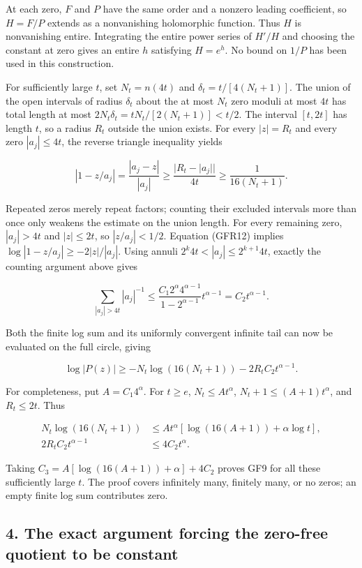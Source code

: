 At each zero, \(F\) and \(P\) have the same order and a nonzero leading coefficient, so \(H=F/P\) extends as a nonvanishing holomorphic function. Thus \(H\) is nonvanishing entire. Integrating the entire power series of \(H'/H\) and choosing the constant at zero gives an entire \(h\) satisfying \(H=e^h\). No bound on \(1/P\) has been used in this construction.

For sufficiently large \(t\), set \(N_t=n(4t)\) and \(\delta_t=t/[4(N_t+1)]\). The union of the open intervals of radius \(\delta_t\) about the at most \(N_t\) zero moduli at most \(4t\) has total length at most \(2N_t\delta_t=tN_t/[2(N_t+1)]<t/2\). The interval \([t,2t]\) has length \(t\), so a radius \(R_t\) outside the union exists. For every \(|z|=R_t\) and every zero \(|a_j|\le4t\), the reverse triangle inequality yields

\[
|1-z/a_j|=\frac{|a_j-z|}{|a_j|}
\ge\frac{|R_t-|a_j||}{4t}
\ge\frac1{16(N_t+1)}.
\tag{GFR13}
\]

Repeated zeros merely repeat factors; counting their excluded intervals more than once only weakens the estimate on the union length. For every remaining zero, \(|a_j|>4t\) and \(|z|\le2t\), so \(|z/a_j|<1/2\). Equation (GFR12) implies \(\log|1-z/a_j|\ge-2|z|/|a_j|\). Using annuli \(2^k4t<|a_j|\le2^{k+1}4t\), exactly the counting argument above gives

\[
\sum_{|a_j|>4t}|a_j|^{-1}
\le\frac{C_1 2^\alpha4^{\alpha-1}}{1-2^{\alpha-1}}t^{\alpha-1}
=C_2t^{\alpha-1}.
\tag{GFR14}
\]

Both the finite log sum and its uniformly convergent infinite tail can now be evaluated on the full circle, giving

\[
\log|P(z)|
\ge-N_t\log(16(N_t+1))-2R_tC_2t^{\alpha-1}.
\tag{GFR15}
\]

For completeness, put \(A=C_1 4^\alpha\). For \(t\ge e\), \(N_t\le At^\alpha\), \(N_t+1\le(A+1)t^\alpha\), and \(R_t\le2t\). Thus

\[
\begin{split}
N_t\log(16(N_t+1))
&\le At^\alpha[\log(16(A+1))+\alpha\log t],\\
2R_tC_2t^{\alpha-1}&\le4C_2t^\alpha.
\end{split}
\]

Taking \(C_3=A[\log(16(A+1))+\alpha]+4C_2\) proves GF9 for all these sufficiently large \(t\). The proof covers infinitely many, finitely many, or no zeros; an empty finite log sum contributes zero.

\subsection{4. The exact argument forcing the zero-free quotient to be constant}\label{the-exact-argument-forcing-the-zero-free-quotient-to-be-constant}

